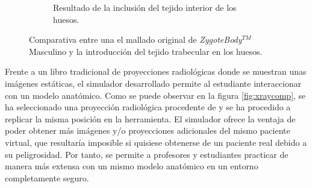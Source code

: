 \begin{figure}[ht]
\begin{subfigure}[b]{0.45\linewidth}
        \caption{Resultado de la inclusión del tejido interior de los huesos.}
    \end{subfigure}
    \caption{\label{fig:bonecompare} Comparativa entre una el mallado original de \emph{ZygoteBody}$^{TM}$ Masculino y la introducción del tejido trabecular en los huesos.}
   \end{figure}


Frente a un libro tradicional de proyecciones radiológicas donde se muestran unas imágenes estáticas, 
el simulador desarrollado permite al estudiante interaccionar con un modelo anatómico.
Como se puede observar en la figura \ref{fig:xraycomp}, se ha seleccionado una proyección radiológica procedente de \cite{carver2012medical} y se ha procedido a replicar la misma posición en la herramienta. El simulador ofrece la ventaja de poder obtener más imágenes y/o proyecciones adicionales del mismo paciente virtual, que resultaría imposible si quisiese obtenerse de un paciente real debido a su peligrosidad. Por tanto, se  permite a profesores y estudiantes practicar de manera más extensa con un mismo modelo anatómico en un entorno completamente seguro.



